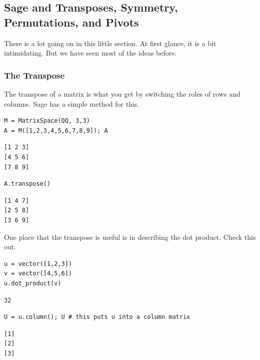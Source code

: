 \documentclass[10pt,]{book}
\theoremstyle{plain}
\numberwithin{equation}{section}
\begin{document}
\subsection[Sage and Transposes, Symmetry, Permutations, and Pivots]{Sage and Transposes, Symmetry, Permutations, and Pivots}\label{subsection-54}

      There is a lot going on in this little section. At first glance, it is a
      bit intimidating. But we have seen most of the ideas before.
\typeout{************************************************}
\typeout{************************************************}
\subsubsection[The Transpose]{The Transpose}\label{subsubsection-32}

        The transpose of a matrix is what you get by switching the roles of rows
        and columns. Sage has a simple method for this.
\begin{lstlisting}[style=sageinput]
M = MatrixSpace(QQ, 3,3)
A = M([1,2,3,4,5,6,7,8,9]); A
\end{lstlisting}
\begin{lstlisting}[style=sageoutput]
[1 2 3]
[4 5 6]
[7 8 9]
\end{lstlisting}
\begin{lstlisting}[style=sageinput]
A.transpose()
\end{lstlisting}
\begin{lstlisting}[style=sageoutput]
[1 4 7]
[2 5 8]
[3 6 9]
\end{lstlisting}
\par

        One place that the transpose is useful is in describing the dot product.
        Check this out.
\begin{lstlisting}[style=sageinput]
u = vector([1,2,3])
v = vector([4,5,6])
u.dot_product(v)
\end{lstlisting}
\begin{lstlisting}[style=sageoutput]
32
\end{lstlisting}
\begin{lstlisting}[style=sageinput]
U = u.column(); U # this puts u into a column matrix
\end{lstlisting}
\begin{lstlisting}[style=sageoutput]
[1]
[2]
[3]
\end{lstlisting}
\par
\end{document}
